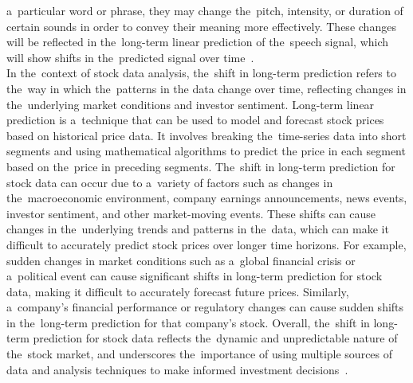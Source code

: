 a~particular word or phrase, they may change the~pitch, intensity, or duration of certain sounds in order to
convey their meaning more effectively. These changes will be reflected in the~long-term linear prediction
of the~speech signal, which will show shifts in the~predicted signal over time~\cite{Kinoshita}.\\
In the~context of stock data analysis, the~shift in long-term prediction refers to the~way in which the~patterns
in the data change over time, reflecting changes in the~underlying market conditions and investor sentiment.
Long-term linear prediction is a~technique that can be used to model and forecast stock prices based on historical
price data. It involves breaking the~time-series data into short segments and using mathematical algorithms to predict
the price in each segment based on the~price in preceding segments. The~shift in long-term prediction for stock data
can occur due to a~variety of factors such as changes in the~macroeconomic environment, company earnings announcements,
news events, investor sentiment, and other market-moving events. These shifts can cause changes in the~underlying trends
and patterns in the~data, which can make it difficult to accurately predict stock prices over longer time horizons.
For example, sudden changes in market conditions such as a~global financial crisis or a~political event can cause
significant shifts in long-term prediction for stock data, making it difficult to accurately forecast future prices.
Similarly, a~company's financial performance or regulatory changes can cause sudden shifts in the~long-term prediction
for that company's stock. Overall, the~shift in long-term prediction for stock data reflects the~dynamic and
unpredictable nature of the~stock market, and underscores the~importance of using multiple sources of data and analysis
techniques to make informed investment decisions~\cite{mills2015time}.\\

